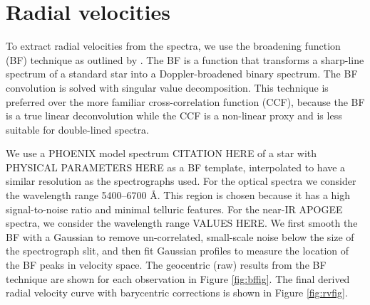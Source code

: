 \section{Radial velocities}\label{rvs}
To extract radial velocities from the spectra, we use the broadening function (BF) technique as outlined by \citet{ruc02}. The BF is a function that transforms a sharp-line spectrum of a standard star into a Doppler-broadened binary spectrum. The BF convolution is solved with singular value decomposition. This technique is preferred over the more familiar cross-correlation function (CCF), because the BF is a true linear deconvolution while the CCF is a non-linear proxy and is less suitable for double-lined spectra.

We use a PHOENIX model spectrum CITATION HERE of a star with PHYSICAL PARAMETERS HERE as a BF template, interpolated to have a similar resolution as the spectrographs used. For the optical spectra we consider the wavelength range 5400--6700 \AA. This region is chosen because it has a high signal-to-noise ratio and minimal telluric features. For the near-IR APOGEE spectra, we consider the wavelength range VALUES HERE. We first smooth the BF with a Gaussian to remove un-correlated, small-scale noise below the size of the spectrograph slit, and then fit Gaussian profiles to measure the location of the BF peaks in velocity space. The geocentric (raw) results from the BF technique are shown for each observation in Figure \ref{fig:bffig}. The final derived radial velocity curve with barycentric corrections is shown in Figure \ref{fig:rvfig}.
